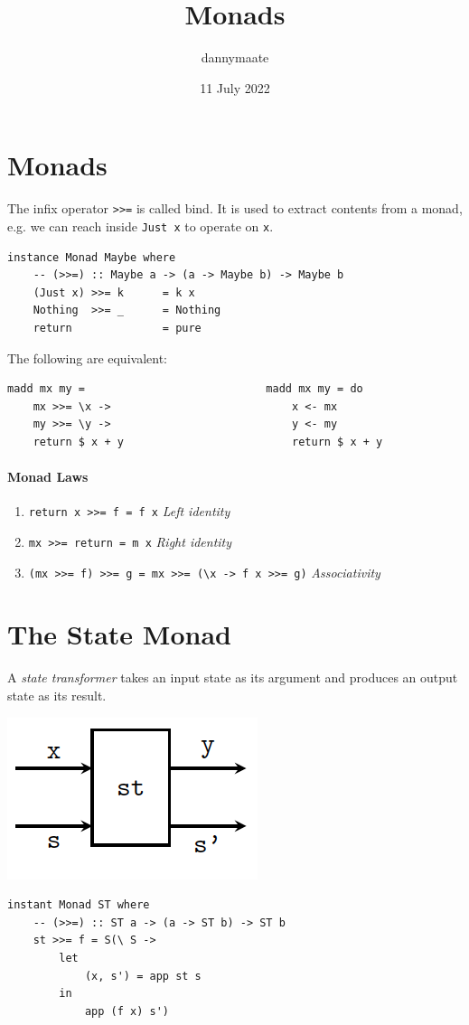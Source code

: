 \documentclass{article}
\title{Monads}
\author{dannymaate}
\date{11 July 2022}
\begin{document}
\maketitle

\section{Monads}
The infix operator \textcolor{Emerald}{\texttt{>>=}} is called \textcolor{Mulberry}{bind}. It is used to extract contents from a monad, e.g. we can reach inside \textcolor{Emerald}{\texttt{Just x}} to operate on \textcolor{Emerald}{\texttt{x}}.


\begin{verbatim}
instance Monad Maybe where
    -- (>>=) :: Maybe a -> (a -> Maybe b) -> Maybe b
    (Just x) >>= k      = k x
    Nothing  >>= _      = Nothing
    return              = pure
\end{verbatim}
The following are equivalent:
\begin{verbatim}
madd mx my =                            madd mx my = do
    mx >>= \x ->                            x <- mx 
    my >>= \y ->                            y <- my 
    return $ x + y                          return $ x + y
\end{verbatim}
\paragraph{Monad Laws}
\begin{enumerate}
    \item \texttt{return x >>= f    = f x} \textcolor{Mulberry}{\emph{Left identity}}
    \item \texttt{mx >>= return     = m x}
    \textcolor{Mulberry}{\emph{Right identity}}
    \item \texttt{(mx >>= f) >>= g  = mx >>= (\textbackslash x -> f x >>= g)} \textcolor{Mulberry}{\emph{Associativity}}
\end{enumerate}

\section{The State Monad}
A \emph{state transformer} takes an input state as its argument and produces an output state as its result.

\includegraphics[scale=0.5]{images/st.PNG}
\begin{verbatim}
instant Monad ST where 
    -- (>>=) :: ST a -> (a -> ST b) -> ST b
    st >>= f = S(\ S ->
        let 
            (x, s') = app st s 
        in 
            app (f x) s')
\end{verbatim}

\
\end{document}
